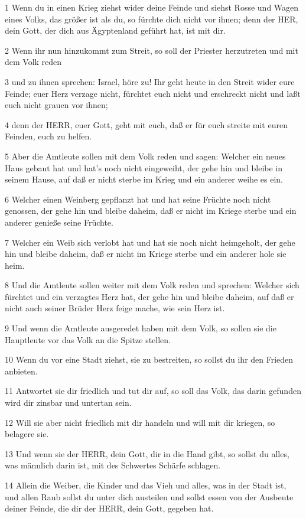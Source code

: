 \par 1 Wenn du in einen Krieg ziehst wider deine Feinde und siehst Rosse und Wagen eines Volks, das größer ist als du, so fürchte dich nicht vor ihnen; denn der HER, dein Gott, der dich aus Ägyptenland geführt hat, ist mit dir.
\par 2 Wenn ihr nun hinzukommt zum Streit, so soll der Priester herzutreten und mit dem Volk reden
\par 3 und zu ihnen sprechen: Israel, höre zu! Ihr geht heute in den Streit wider eure Feinde; euer Herz verzage nicht, fürchtet euch nicht und erschreckt nicht und laßt euch nicht grauen vor ihnen;
\par 4 denn der HERR, euer Gott, geht mit euch, daß er für euch streite mit euren Feinden, euch zu helfen.
\par 5 Aber die Amtleute sollen mit dem Volk reden und sagen: Welcher ein neues Haus gebaut hat und hat's noch nicht eingeweiht, der gehe hin und bleibe in seinem Hause, auf daß er nicht sterbe im Krieg und ein anderer weihe es ein.
\par 6 Welcher einen Weinberg gepflanzt hat und hat seine Früchte noch nicht genossen, der gehe hin und bleibe daheim, daß er nicht im Kriege sterbe und ein anderer genieße seine Früchte.
\par 7 Welcher ein Weib sich verlobt hat und hat sie noch nicht heimgeholt, der gehe hin und bleibe daheim, daß er nicht im Kriege sterbe und ein anderer hole sie heim.
\par 8 Und die Amtleute sollen weiter mit dem Volk reden und sprechen: Welcher sich fürchtet und ein verzagtes Herz hat, der gehe hin und bleibe daheim, auf daß er nicht auch seiner Brüder Herz feige mache, wie sein Herz ist.
\par 9 Und wenn die Amtleute ausgeredet haben mit dem Volk, so sollen sie die Hauptleute vor das Volk an die Spitze stellen.
\par 10 Wenn du vor eine Stadt ziehst, sie zu bestreiten, so sollst du ihr den Frieden anbieten.
\par 11 Antwortet sie dir friedlich und tut dir auf, so soll das Volk, das darin gefunden wird dir zinsbar und untertan sein.
\par 12 Will sie aber nicht friedlich mit dir handeln und will mit dir kriegen, so belagere sie.
\par 13 Und wenn sie der HERR, dein Gott, dir in die Hand gibt, so sollst du alles, was männlich darin ist, mit des Schwertes Schärfe schlagen.
\par 14 Allein die Weiber, die Kinder und das Vieh und alles, was in der Stadt ist, und allen Raub sollst du unter dich austeilen und sollst essen von der Ausbeute deiner Feinde, die dir der HERR, dein Gott, gegeben hat.
